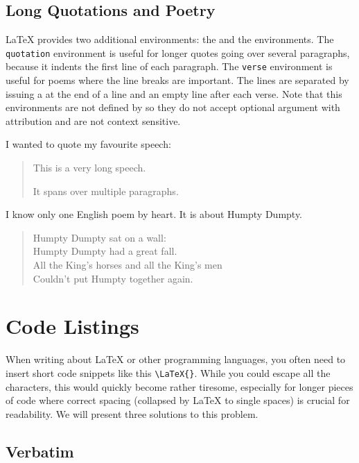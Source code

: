 \subsection{Long Quotations and Poetry}
\LaTeX{} provides two additional environments: the  and the
 environments. The \texttt{quotation} environment is useful for
longer quotes going over several paragraphs, because it indents the first line
of each paragraph. The \texttt{verse} environment is useful for poems where the
line breaks are important. The lines are separated by issuing a \ci{\bs} at the
end of a line and an empty line after each verse. Note that this environments
are not defined by  so they do not accept optional argument with
attribution and are not context sensitive.

\begin{example}
I wanted to quote my
favourite speech:
\begin{quotation}
  This is a very
  long speech.

  It spans over multiple
  paragraphs.
\end{quotation}
\end{example}

\begin{example}
I know only one English poem by
heart. It is about Humpty Dumpty.
\begin{verse}
Humpty Dumpty sat on a wall:\\
Humpty Dumpty had a great fall.\\
All the King's horses and all
the King's men\\
Couldn't put Humpty together
again.
\end{verse}
\end{example}

\section{Code Listings}

When writing about \LaTeX{} or other programming languages, you often need to
insert short code snippets like this \verb|\LaTeX{}|. While you could escape
all the characters, this would quickly become rather tiresome, especially for
longer pieces of code where correct spacing (collapsed by \LaTeX{} to single
spaces) is crucial for readability. We will present three solutions to this
problem.

\subsection{Verbatim}\label{sec:verbatim}


